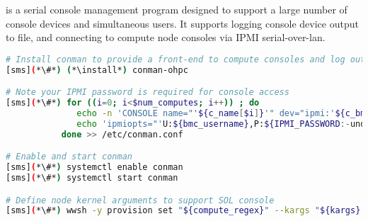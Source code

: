 \conman{} is a serial console management program designed to support a large
number of console devices and simultaneous users. It supports logging console
device output to file, and connecting to compute node consoles via IPMI
serial-over-lan.

\begin{lstlisting}[language=bash,keywords={},upquote=true]
# Install conman to provide a front-end to compute consoles and log output
[sms](*\#*) (*\install*) conman-ohpc

# Note your IPMI password is required for console access
[sms](*\#*) for ((i=0; i<$num_computes; i++)) ; do
              echo -n 'CONSOLE name="'${c_name[$i]}'" dev="ipmi:'${c_bmc[$i]}'" '
              echo 'ipmiopts="'U:${bmc_username},P:${IPMI_PASSWORD:-undefined},W:solpayloadsize'"'
           done >> /etc/conman.conf

# Enable and start conman
[sms](*\#*) systemctl enable conman
[sms](*\#*) systemctl start conman

# Define node kernel arguments to support SOL console
[sms](*\#*) wwsh -y provision set "${compute_regex}" --kargs "${kargs} console=ttyS1,115200"
\end{lstlisting}

